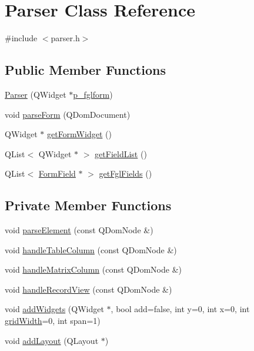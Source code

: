 \hypertarget{classParser}{
\section{Parser Class Reference}
\label{classParser}
}


{\ttfamily \#include $<$parser.h$>$}

\subsection*{Public Member Functions}
\begin{DoxyCompactItemize}
\item 
\hyperlink{classParser_aefe5848f785f24b3e225c19c2164c792}{Parser} (QWidget $\ast$\hyperlink{classParser_a8ae7aeec1e5360fa29b9976624cde0f1}{p\_\-fglform})
\item 
void \hyperlink{classParser_a6df35e9ed4a8615a7224aa51e91a46d3}{parseForm} (QDomDocument)
\item 
QWidget $\ast$ \hyperlink{classParser_a03625492828e17a3e1a540f7a0e07b75}{getFormWidget} ()
\item 
QList$<$ QWidget $\ast$ $>$ \hyperlink{classParser_ae6283c9c8504b6d7ea3f95599b8dfa8d}{getFieldList} ()
\item 
QList$<$ \hyperlink{classFormField}{FormField} $\ast$ $>$ \hyperlink{classParser_a4b4c41ad7831993e9d4cd52468d5fe88}{getFglFields} ()
\end{DoxyCompactItemize}
\subsection*{Private Member Functions}
\begin{DoxyCompactItemize}
\item 
void \hyperlink{classParser_ae02f5da1e3974e81746c91dae0e265a2}{parseElement} (const QDomNode \&)
\item 
void \hyperlink{classParser_a806540a8e1fab811586a5f5df0aead21}{handleTableColumn} (const QDomNode \&)
\item 
void \hyperlink{classParser_a9f4c1bd5465f5abc6587ee66d2a085da}{handleMatrixColumn} (const QDomNode \&)
\item 
void \hyperlink{classParser_afd7f37611e56b353507ebbf79ae0edb5}{handleRecordView} (const QDomNode \&)
\item 
void \hyperlink{classParser_a80b5245c70a7f73fcdba2c61096cc21f}{addWidgets} (QWidget $\ast$, bool add=false, int y=0, int x=0, int \hyperlink{classParser_a52e6fad38b265e732b7667aab6648472}{gridWidth}=0, int span=1)
\item 
void \hyperlink{classParser_a97f0648d8b9a23badc802076b88db7ef}{addLayout} (QLayout $\ast$)
\end{DoxyCompactItemize}
